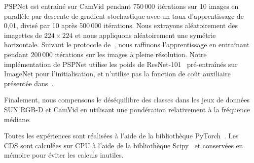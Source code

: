 PSPNet est entraîné sur CamVid pendant 750\,000 itérations sur 10 images en parallèle par descente de gradient stochastique avec un taux d'apprentissage de 0,01, divisé par 10 après 500\,000 itérations. Nous extrayons aléatoirement des imagettes de $224\times224$ et nous appliquons aléatoirement une symétrie horizontale. Suivant le protocole de~\cite{jegou_one_2017}, nous raffinons l'apprentissage en entraînant pendant 200\,000 itérations sur les images à pleine résolution.
Notre implémentation de PSPNet utilise les poids de ResNet-101~\cite{he_deep_2016} pré-entraînés sur ImageNet pour l'initialisation, et n'utilise pas la fonction de coût auxiliaire présentée dans~\cite{zhao_pyramid_2017}.

Finalement, nous compensons le déséquilibre des classes dans les jeux de données SUN RGB-D et CamVid en utilisant une pondération relativement à la fréquence médiane.

Toutes les expériences sont réalisées à l'aide de la bibliothèque PyTorch~\cite{noauthor_pytorch:_2016}. Les CDS sont calculées sur CPU à l'aide de la bibliothèque Scipy~\cite{jones_scipy:_2001} et conservées en mémoire pour éviter les calculs inutiles.

